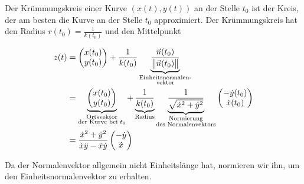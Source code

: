 \documentclass[12pt]{article}
\newenvironment{definition}[2][Definition]{\begin{trivlist}
        \item[\hskip \labelsep {\bfseries #1}\hskip \labelsep {\bfseries #2.}]}{\flushright{$\square$}\end{trivlist}}
\begin{document}
\begin{definition}{[Krümmungskreis]}
    Der Krümmungskreis einer Kurve $(x(t), y(t))$ an der Stelle $t_0$ ist der Kreis, der am besten die Kurve an der Stelle $t_0$ approximiert. Der Krümmungskreis hat den Radius $r(t_0)=\frac{1}{k(t_0)}$ und den Mittelpunkt
    \begin{spreadlines}{0.8em}
        \begin{align*}
            z(t) & = \begin{pmatrix}
                         x(t_0) \\
                         y(t_0)
                     \end{pmatrix}+\frac{1}{k(t_0)}\underbrace{\frac{\vec{n}(t_0)}{\norm{\vec{n}(t_0)}}}_{\substack{\text{Einheitsnormalen-} \\\text{vektor}}} \\
                 & =\underbrace{\begin{pmatrix}
                                        x(t_0) \\
                                        y(t_0)
                                    \end{pmatrix}}_{\substack{\text{Ortsvektor}                                                                  \\\text{der Kurve bei $t_0$}}}+\underbrace{\frac{1}{k(t_0)}}_{\text{Radius}}\underbrace{\frac{1}{\sqrt{\dot{x}^2+\dot{y}^2}}}_{\substack{\text{Normierung}\\\text{des Normalenvektors}}}\begin{pmatrix}
                -\dot{y}(t_0) \\
                \dot{x}(t_0)
            \end{pmatrix}\\
                 & =\frac{\dot{x}^2+\dot{y}^2}{\dot{x}\ddot{y}-\ddot{x}\dot{y}}\begin{pmatrix}
                                                                                   -\dot{y} \\
                                                                                   \dot{x}
                                                                               \end{pmatrix}
        \end{align*}
    \end{spreadlines}
    Da der Normalenvektor allgemein nicht Einheitslänge hat, normieren wir ihn, um den Einheitsnormalenvektor zu erhalten.
\end{definition}
\end{document}
